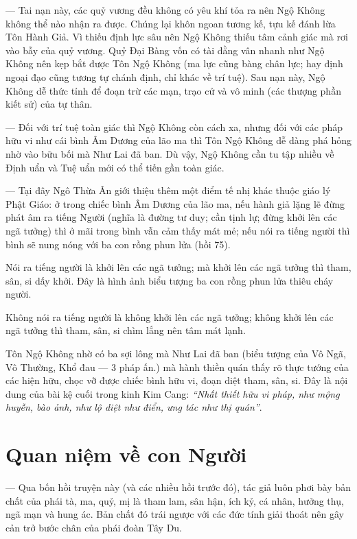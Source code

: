 --- Tai nạn này, các quỷ vương đều không có yêu khí tỏa ra nên Ngộ Không không thể nào nhận ra được. Chúng lại khôn ngoan tương kế, tựu kế đánh lừa Tôn Hành Giả. Vì thiếu định lực sâu nên Ngộ Không thiếu tâm cảnh giác mà rơi vào bẫy của quỷ vương. Quỷ Đại Bàng vốn có tài đằng vân nhanh như Ngộ Không nên kẹp bắt được Tôn Ngộ Không (ma lực cũng bàng chân lực; hay định ngoại đạo cũng tương tự chánh định, chỉ khác về trí tuệ). Sau nạn này, Ngộ Không dễ thức tỉnh để đoạn trừ các mạn, trạo cử và vô minh (các thượng phần kiết sử) của tự thân.

--- Đối với trí tuệ toàn giác thì Ngộ Không còn cách xa, nhưng đối với các pháp hữu vi như cái bình Âm Dương của lão ma thì Tôn Ngộ Không dễ dàng phá hỏng nhờ vào bữu bối mà Như Lai đã ban. Dù vậy, Ngộ Không cần tu tập nhiều về Định uẩn và Tuệ uẩn mới có thể tiến gần toàn giác.

--- Tại đây Ngô Thừa Ân giới thiệu thêm một điểm tế nhị khác thuộc giáo lý Phật Giáo: ở trong chiếc bình Âm Dương của lão ma, nếu hành giả lặng lẽ đừng phát âm ra tiếng Người (nghĩa là đường tư duy; cần tịnh lự; đừng khởi lên các ngã tưởng) thì ở mãi trong bình vẫn cảm thấy mát mẻ; nếu nói ra tiếng người thì bình sẽ nung nóng với ba con rồng phun lửa (hồi 75).

Nói ra tiếng người là khởi lên các ngã tưởng; mà khởi lên các ngã tưởng thì tham, sân, si dấy khởi. Đây là hình ảnh biểu tượng ba con rồng phun lửa thiêu cháy người.

Không nói ra tiếng người là không khởi lên các ngã tưởng; không khởi lên các ngã tưởng thì tham, sân, si chìm lắng nên tâm mát lạnh.

Tôn Ngộ Không nhờ có ba sợi lông mà Như Lai đã ban (biểu tượng của Vô Ngã, Vô Thường, Khổ đau --- 3 pháp ấn.) mà hành thiền quán thấy rõ thực tướng của các hiện hữu, chọc vỡ được chiếc bình hữu vi, đoạn diệt tham, sân, si. Đây là nội dung của bài kệ cuối trong kinh Kim Cang: \emph{``Nhất thiết hữu vi pháp, như mộng huyễn, bào ảnh, như lộ diệt như điển, ưng tác như thị quán''}.

\section{Quan niệm về con Người} %
\label{sec:74_75_con_nguoi}

--- Qua bốn hồi truyện này (và các nhiều hồi trước đó), tác giả luôn phơi bày bản chất của phái tà, ma, quỷ, mị là tham lam, sân hận, ích kỷ, cá nhân, hưởng thụ, ngã mạn và hung ác. Bản chất đó trái ngược với các đức tính giải thoát nên gây cản trở bước chân của phái đoàn Tây Du.

